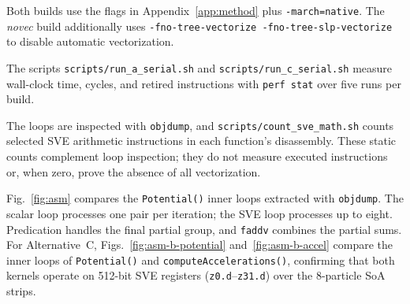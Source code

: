 \documentclass[conference]{IEEEtran}
\begin{document}
{\raggedright
\begin{IEEEdescription}
  \item[Compile:] Both builds use the flags in
    Appendix~\ref{app:method} plus \texttt{-march=native}.
    The \emph{novec} build additionally uses
    \texttt{-fno-tree-vectorize -fno-tree-slp-vectorize} to disable
    automatic vectorization.
  \item[Record:] The scripts \texttt{scripts/run\_a\_serial.sh} and
    \texttt{scripts/run\_c\_serial.sh} measure wall-clock time, cycles,
    and retired instructions with \texttt{perf stat} over five runs per
    build.
  \item[Report:] The loops are inspected with \texttt{objdump}, and
    \texttt{scripts/count\_sve\_math.sh} counts selected SVE arithmetic
    instructions in each function's disassembly. These static counts
    complement loop inspection; they do not measure executed
    instructions or, when zero, prove the absence of all vectorization.
\end{IEEEdescription}\par}

Fig.~\ref{fig:asm} compares the \texttt{Potential()} inner loops
extracted with \texttt{objdump}. The scalar loop processes one pair
per iteration; the SVE loop processes up to eight. Predication handles
the final partial group, and \texttt{faddv} combines the partial sums.
For Alternative~C, Figs.~\ref{fig:asm-b-potential} and~\ref{fig:asm-b-accel}
compare the inner loops of \texttt{Potential()} and
\texttt{computeAccelerations()}, confirming that both kernels operate on
512-bit SVE registers (\texttt{z0.d}--\texttt{z31.d}) over the 8-particle
SoA strips.
\end{document}
